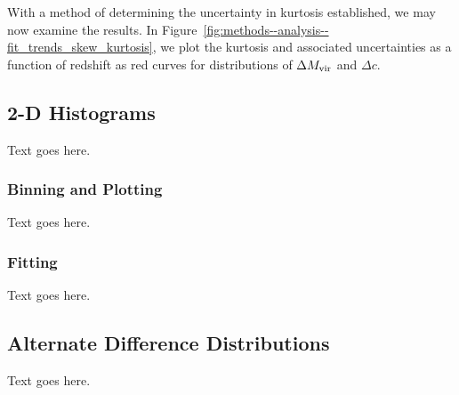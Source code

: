 With a method of determining the uncertainty in kurtosis established, we may now examine the results.  In Figure~\ref{fig:methods--analysis--fit_trends_skew_kurtosis}, we plot the kurtosis and associated uncertainties as a function of redshift as red curves for distributions of $\Delta {M_{\mathrm{vir}}}$ and $\Delta c$.




\subsection{2-D Histograms}
\label{subsec:analysis--2d_histograms}


Text goes here.



\subsubsection{Binning and Plotting}
\label{subsubsec:analysis--2d_histograms--binning_plotting}


Text goes here.



\subsubsection{Fitting}
\label{subsubsec:analysis--2d_histograms--fitting}


Text goes here.




\subsection{Alternate Difference Distributions}
\label{subsec:analysis--alt_diff_dist}


Text goes here.



